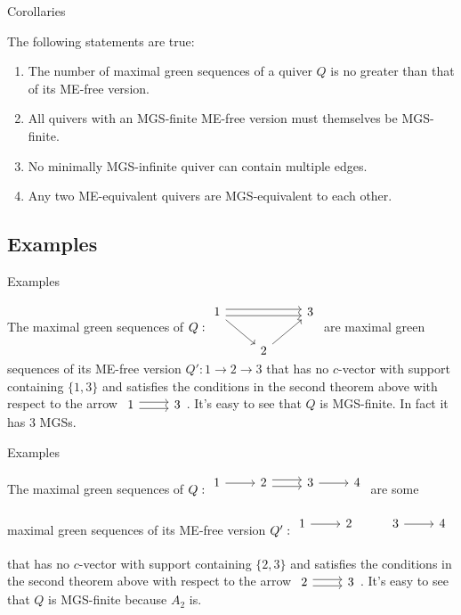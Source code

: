 \documentclass{beamer}
\newcommand{\rightdoublearrow}{\arrow[r, shift right=0.6ex]\arrow[r, shift left=0.6ex]}
\newcommand{\righttwicedoublearrow}{\arrow[rr, shift right=0.6ex]\arrow[rr, shift left=0.6ex]}
\begin{document}
\begin{frame}{Corollaries}
\begin{corollary}\label{CB}
The following statements are true:
\begin{enumerate}
\item The number of maximal green sequences of a quiver $Q$ is no greater than that of its ME-free version.\pause
\item All quivers with an MGS-finite ME-free version must themselves be MGS-finite.\pause
\item No minimally MGS-infinite quiver can contain multiple edges.\pause
\item Any two ME-equivalent quivers are MGS-equivalent to each other.
\end{enumerate}
\end{corollary}
\end{frame}

\subsection{Examples}
\begin{frame}[fragile]{Examples}
\begin{example}
The maximal green sequences of $Q: \begin{tikzcd}
1\righttwicedoublearrow\arrow[rd] &  & 3\\
 & 2\arrow[ur]
\end{tikzcd}$ are maximal green sequences of its ME-free version $Q': 1\to 2\to 3$ that has no $c$-vector with support containing $\{1,3\}$ and satisfies the conditions in the second theorem above with respect to the arrow $\begin{tikzcd} 1\rightdoublearrow & 3\end{tikzcd}$. It's easy to see that $Q$ is MGS-finite. In fact it has 3 MGSs.
\end{example}
\end{frame}

\begin{frame}[fragile]{Examples}
\begin{example}
The maximal green sequences of $Q: \begin{tikzcd}
1\arrow[r] & 2 \rightdoublearrow&  3 \arrow[r] & 4\\
\end{tikzcd}$ are some maximal green sequences of its ME-free version $Q': \begin{tikzcd}
1\arrow[r] & 2&  3 \arrow[r] & 4\\
\end{tikzcd}$ that has no $c$-vector with support containing $\{2,3\}$ and satisfies the conditions in the second theorem above with respect to the arrow $\begin{tikzcd} 2\rightdoublearrow & 3\end{tikzcd}$. It's easy to see that $Q$ is MGS-finite because $A_2$ is.
\end{example}
\end{frame}
\end{document}
